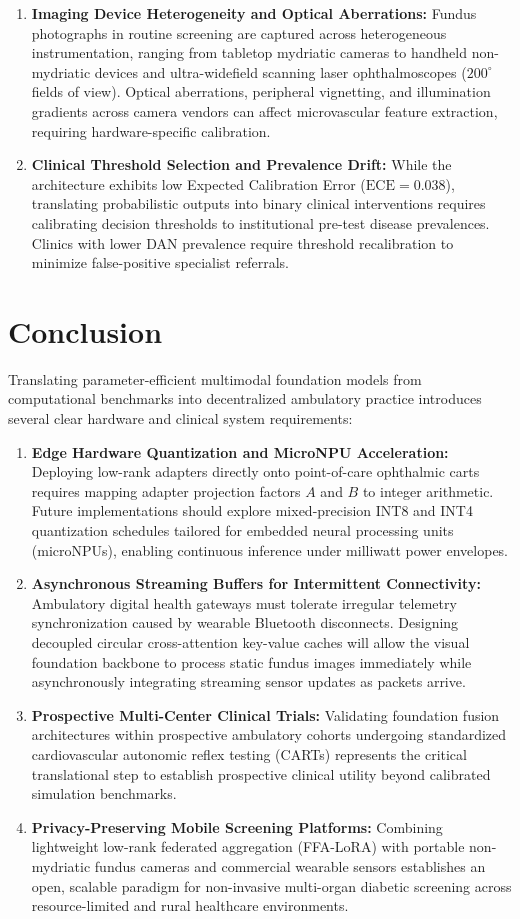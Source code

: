 \documentclass[a4paper,fleqn]{cas-dc}
\begin{document}
\begin{enumerate}
    \item \textbf{Imaging Device Heterogeneity and Optical Aberrations:} Fundus photographs in routine screening are captured across heterogeneous instrumentation, ranging from tabletop mydriatic cameras to handheld non-mydriatic devices and ultra-widefield scanning laser ophthalmoscopes ($200^\circ$ fields of view). Optical aberrations, peripheral vignetting, and illumination gradients across camera vendors can affect microvascular feature extraction, requiring hardware-specific calibration.
    \item \textbf{Clinical Threshold Selection and Prevalence Drift:} While the architecture exhibits low Expected Calibration Error ($\text{ECE}=0.038$), translating probabilistic outputs into binary clinical interventions requires calibrating decision thresholds to institutional pre-test disease prevalences. Clinics with lower DAN prevalence require threshold recalibration to minimize false-positive specialist referrals.
\end{enumerate}

\section{Conclusion}
\label{sec:conclusion}
Translating parameter-efficient multimodal foundation models from computational benchmarks into decentralized ambulatory practice introduces several clear hardware and clinical system requirements:
\begin{enumerate}
    \item \textbf{Edge Hardware Quantization and MicroNPU Acceleration:} Deploying low-rank adapters directly onto point-of-care ophthalmic carts requires mapping adapter projection factors $A$ and $B$ to integer arithmetic. Future implementations should explore mixed-precision INT8 and INT4 quantization schedules tailored for embedded neural processing units (microNPUs), enabling continuous inference under milliwatt power envelopes.
    \item \textbf{Asynchronous Streaming Buffers for Intermittent Connectivity:} Ambulatory digital health gateways must tolerate irregular telemetry synchronization caused by wearable Bluetooth disconnects. Designing decoupled circular cross-attention key-value caches will allow the visual foundation backbone to process static fundus images immediately while asynchronously integrating streaming sensor updates as packets arrive.
    \item \textbf{Prospective Multi-Center Clinical Trials:} Validating foundation fusion architectures within prospective ambulatory cohorts undergoing standardized cardiovascular autonomic reflex testing (CARTs) represents the critical translational step to establish prospective clinical utility beyond calibrated simulation benchmarks.
    \item \textbf{Privacy-Preserving Mobile Screening Platforms:} Combining lightweight low-rank federated aggregation (FFA-LoRA) with portable non-mydriatic fundus cameras and commercial wearable sensors establishes an open, scalable paradigm for non-invasive multi-organ diabetic screening across resource-limited and rural healthcare environments.
\end{enumerate}
\end{document}

